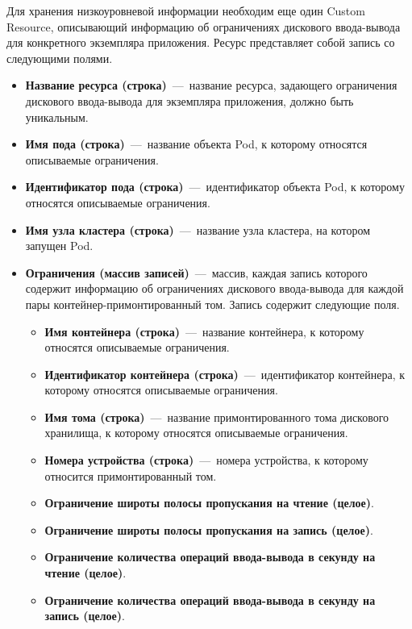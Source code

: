 Для хранения низкоуровневой информации необходим еще один Custom Resource, описывающий информацию об ограничениях дискового ввода-вывода для конкретного экземпляра приложения. Ресурс представляет собой запись со следующими полями.

\begin{itemize}
	\item \textbf{Название ресурса (строка)}~---~название ресурса, задающего ограничения дискового ввода-вывода для экземпляра приложения, должно быть уникальным.
	\item \textbf{Имя пода (строка)}~---~название объекта Pod, к которому относятся описываемые ограничения.
	\item \textbf{Идентификатор пода (строка)}~---~идентификатор объекта Pod, к которому относятся описываемые ограничения.
	\item \textbf{Имя узла кластера (строка)}~---~название узла кластера, на котором запущен Pod.
	\item \textbf{Ограничения (массив записей)}~---~массив, каждая запись которого содержит информацию об ограничениях дискового ввода-вывода для каждой пары контейнер-примонтированный том. Запись содержит следующие поля.
	
	\begin{itemize}
		\item \textbf{Имя контейнера (строка)}~---~название контейнера, к которому относятся описываемые ограничения.
		\item \textbf{Идентификатор контейнера (строка)}~---~идентификатор контейнера, к которому относятся описываемые ограничения.
		\item \textbf{Имя тома (строка)}~---~название примонтированного тома дискового хранилища, к которому относятся описываемые ограничения.
		\item \textbf{Номера устройства (строка)}~---~номера устройства, к которому относится примонтированный том.
		\item \textbf{Ограничение широты полосы пропускания на чтение (целое)}.
		\item \textbf{Ограничение широты полосы пропускания на запись (целое)}.
		\item \textbf{Ограничение количества операций ввода-вывода в секунду на чтение (целое)}.
		\item \textbf{Ограничение количества операций ввода-вывода в секунду на запись (целое)}.
	\end{itemize}
\end{itemize}


